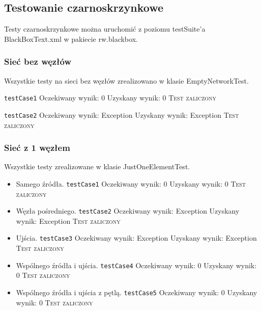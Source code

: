 \subsection{Testowanie czarno\dywiz skrzynkowe}

Testy czarnoskrzynkowe można uruchomić z poziomu testSuite'a BlackBoxText.xml
w pakiecie rw.blackbox.

\subsubsection{Sieć bez węzłów}
Wszystkie testy na sieci bez węzłów zrealizowano w klasie EmptyNetworkTest.

\texttt{testCase1}
Oczekiwany wynik: 0
Uzyskany wynik: 0
\textsc{Test zaliczony}

\texttt{testCase2}
Oczekiwany wynik: Exception
Uzyskany wynik: Exception
\textsc{Test zaliczony}

\subsubsection{Sieć z 1 węzłem}
Wszystkie testy zrealizowane w klasie JustOneElementTest.
\begin{itemize}[nosep]
    \item Samego źródła.
    \texttt{testCase1}
    Oczekiwany wynik: 0
    Uzyskany wynik: 0
    \textsc{Test zaliczony}

    \item Węzła pośredniego.
    \texttt{testCase2}
    Oczekiwany wynik: Exception
    Uzyskany wynik: Exception
    \textsc{Test zaliczony}

    \item Ujścia.
    \texttt{testCase3}
    Oczekiwany wynik: Exception
    Uzyskany wynik: Exception
    \textsc{Test zaliczony}

    \item Wspólnego źródła i ujścia.
    \texttt{testCase4}
    Oczekiwany wynik: 0
    Uzyskany wynik: 0
    \textsc{Test zaliczony}

    \item Wspólnego źródła i ujścia z pętlą.
    \texttt{testCase5}
    Oczekiwany wynik: 0
    Uzyskany wynik: 0
    \textsc{Test zaliczony}

\end{itemize}


